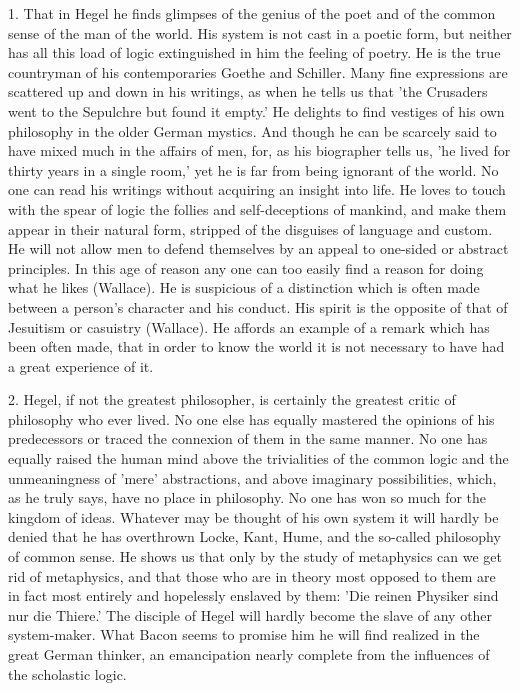 \documentclass[11pt,letter]{article}
\begin{document}
\par  1. That in Hegel he finds glimpses of the genius of the poet and of the common sense of the man of the world. His system is not cast in a poetic form, but neither has all this load of logic extinguished in him the feeling of poetry. He is the true countryman of his contemporaries Goethe and Schiller. Many fine expressions are scattered up and down in his writings, as when he tells us that 'the Crusaders went to the Sepulchre but found it empty.' He delights to find vestiges of his own philosophy in the older German mystics. And though he can be scarcely said to have mixed much in the affairs of men, for, as his biographer tells us, 'he lived for thirty years in a single room,' yet he is far from being ignorant of the world. No one can read his writings without acquiring an insight into life. He loves to touch with the spear of logic the follies and self-deceptions of mankind, and make them appear in their natural form, stripped of the disguises of language and custom. He will not allow men to defend themselves by an appeal to one-sided or abstract principles. In this age of reason any one can too easily find a reason for doing what he likes (Wallace). He is suspicious of a distinction which is often made between a person's character and his conduct. His spirit is the opposite of that of Jesuitism or casuistry (Wallace). He affords an example of a remark which has been often made, that in order to know the world it is not necessary to have had a great experience of it.

\par  2. Hegel, if not the greatest philosopher, is certainly the greatest critic of philosophy who ever lived. No one else has equally mastered the opinions of his predecessors or traced the connexion of them in the same manner. No one has equally raised the human mind above the trivialities of the common logic and the unmeaningness of 'mere' abstractions, and above imaginary possibilities, which, as he truly says, have no place in philosophy. No one has won so much for the kingdom of ideas. Whatever may be thought of his own system it will hardly be denied that he has overthrown Locke, Kant, Hume, and the so-called philosophy of common sense. He shows us that only by the study of metaphysics can we get rid of metaphysics, and that those who are in theory most opposed to them are in fact most entirely and hopelessly enslaved by them: 'Die reinen Physiker sind nur die Thiere.' The disciple of Hegel will hardly become the slave of any other system-maker. What Bacon seems to promise him he will find realized in the great German thinker, an emancipation nearly complete from the influences of the scholastic logic.
\end{document}
